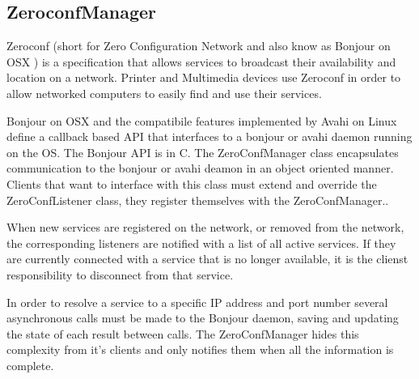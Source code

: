 \subsection{ZeroconfManager}

Zeroconf (short for Zero Configuration Network and also know as Bonjour on OSX ) is a specification that allows services to broadcast their availability and location on a network. Printer and Multimedia devices use Zeroconf in order to allow networked computers to easily find and use their services.

Bonjour on OSX and the compatibile features implemented by Avahi on Linux define a callback based API that interfaces to a bonjour or avahi daemon running on the OS. The Bonjour API is in C. The ZeroConfManager class encapsulates communication to the bonjour or avahi deamon in an object oriented manner. Clients that want to interface with this class must extend and override the ZeroConfListener class, they register themselves with the ZeroConfManager..

When new services are registered on the network, or removed from the network, the corresponding listeners are notified with a list of all active services. If they are currently connected with a service that is no longer available, it is the clienst responsibility to disconnect from that service.

In order to resolve a service to a specific IP address and port number several asynchronous calls must be made to the Bonjour daemon, saving and updating the state of each result between calls. The ZeroConfManager hides this complexity from it's clients and only notifies them when all the information is complete.





